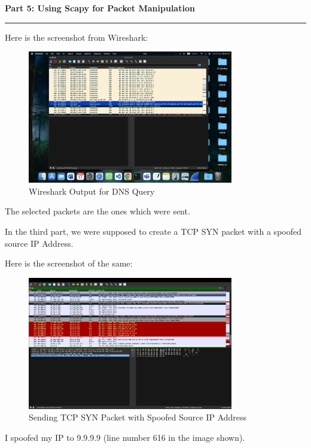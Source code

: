 \documentclass[a4paper,12pt]{article}
\newenvironment{solution}[2][]{%
    \begin{mdframed}[linecolor=blue!70!black, linewidth=2pt, roundcorner=10pt, backgroundcolor=yellow!10!white, skipabove=12pt, skipbelow=12pt]%
        \textbf{\large #2}
        \par\noindent\rule{\textwidth}{0.4pt}
}{
    \end{mdframed}
}
\begin{document}
\begin{solution}{Part 5: Using Scapy for Packet Manipulation}
    Here is the screenshot from Wireshark:

    \begin{figure}[H]
        \centering
        \includegraphics[width=0.8\textwidth]{p52.png}
        \caption{Wireshark Output for DNS Query}
    \end{figure}

    The selected packets are the ones which were sent.

    
    In the third part, we were supposed to create a TCP SYN packet with a spoofed source IP Address.

    Here is the screenshot of the same:

    \begin{figure}[H]
        \centering
        \includegraphics[width=0.8\textwidth]{p53.png}
        \caption{Sending TCP SYN Packet with Spoofed Source IP Address}
    \end{figure}

    I spoofed my IP to 9.9.9.9 (line number 616 in the image shown). 
\end{solution}
\end{document}
